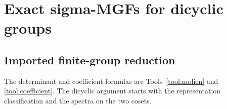 \documentclass[10pt]{article}
\newcommand{\Sym}{\operatorname{Sym}}
\newcommand{\E}{\mathbb E}
\begin{document}
\section{Exact sigma-MGFs for dicyclic groups}\label{proof:dicyclic}
\begingroup
{}
\providecommand{\Dic}{\operatorname{Dic}}
\renewcommand{\Dic}{\operatorname{Dic}}
\providecommand{\Sym}{\operatorname{Sym}}
\renewcommand{\Sym}{\operatorname{Sym}}
\providecommand{\E}{\mathbb E}
\renewcommand{\E}{\mathbb E}
\setcounter{theorem}{0}
\setcounter{proposition}{0}
\setcounter{lemma}{0}
\setcounter{corollary}{0}
\setcounter{remark}{0}
\begin{abstract}
For the dicyclic group $\Dic_m$ of order $4m$, this note proves the proposed
generalized Molien formulas for every complex representation, specializes them
to the two-dimensional irreducibles $\rho_k$, and derives the stated exact
coefficient count.  It also checks direct sums and the regular representation.
The accompanying marimo notebook constructs the matrices themselves and
compares the rank of an explicit Reynolds projector with three independent
formula evaluations.  All representative cases passed to numerical error below
$2.6\times10^{-15}$.
\end{abstract}

\subsection{Imported finite-group reduction}
The determinant and coefficient formulas are Tools~\ref{tool:molien} and
\ref{tool:coefficient}. The dicyclic argument starts with the representation
classification and the spectra on the two cosets.
\end{document}
